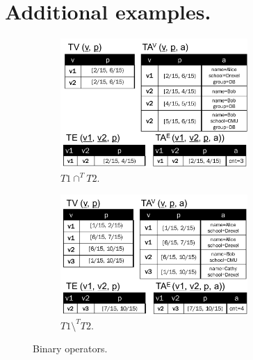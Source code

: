 \appendix 

\section{Additional examples.}
\label{sec:app:examples}

\begin{figure}
\centering
\begin{subfigure}{3in}
\includegraphics[width=2.8in]{figs/T1_inter_T2_rel.pdf}
\caption{$T1 \cap^T T2$.}
\vspace{-0.2cm}
\label{fig:tg_inter}
\end{subfigure}
\begin{subfigure}{3in}
\includegraphics[width=2.8in]{figs/T1_diff_T2_rel.pdf}
\caption{$T1 \setminus^T T2$.}
\vspace{-0.2cm}
\label{fig:tg_diff}
\end{subfigure}
\caption{Binary operators.}
\label{fig:binary}
\vspace{-0.2cm}
\end{figure}

